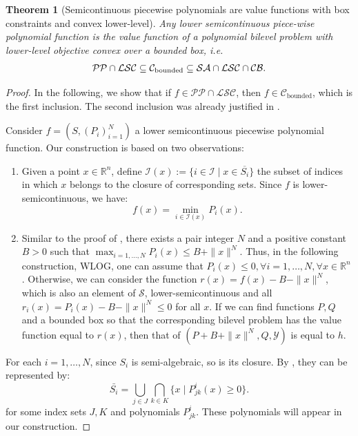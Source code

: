 \documentclass{article}
\newcommand*{\cC}{\mathcal{C}}
\newcommand*{\cI}{\mathcal{I}}
\newcommand*{\cS}{\mathcal{S}}
\newcommand*{\cY}{\mathcal{Y}}
\newcommand*{\RR}{\mathbb{R}}
\newcommand{\tupfuncN}{(P_i)_{i = 1}^N}
\newcommand{\SA}{\mathcal{SA}}
\newcommand{\LSC}{\mathcal{LSC}}
\newcommand{\BC}{\mathcal{CB}}
\newcommand{\PP}{\mathcal{PP}}
\newcommand{\bounded}{\text{bounded}}
\theoremstyle{plain}
\newtheorem{theorem}{Theorem}[section]
\theoremstyle{definition}
\begin{document}
\begin{theorem}[Semicontinuous piecewise polynomials are value functions with box constraints and convex lower-level]
\label{theorem:convex-compact-bilevel-class}
    Any lower semicontinuous piece-wise polynomial function is the value function of a polynomial bilevel problem with lower-level objective convex over a bounded box, i.e.
    \begin{equation*}
        \begin{aligned}
            \PP \cap \LSC \subseteq \cC_{\textup{\bounded}} \subseteq \SA \cap \LSC \cap \BC.
        \end{aligned}
    \end{equation*}
\end{theorem}

\begin{proof}
    In the following, we show that if $f \in \PP \cap \LSC$, then $f \in \cC_{\bounded}$, which is the first inclusion. The second inclusion was already justified in .
    
    Consider $f = (S, \tupfuncN)$ a lower semicontinuous piecewise polynomial function. Our construction is based on two observations:
    \begin{enumerate}
        \item Given a point $x \in \RR^n$, define $\cI(x) := \{i \in \cI \mid x \in \overline{S_i}\}$ the subset of indices in which $x$ belongs to the closure of corresponding sets. Since $f$ is lower-semicontinuous, we have:
        \begin{equation}
            \label{eq:minimum-selection}
            f(x) = \min_{i \in \cI(x)} P_i(x).
        \end{equation}
        \item Similar to the proof of , there exists a pair integer $N$ and a positive constant $B > 0$ such that $\max_{i = 1, \ldots, N} P_i(x) \leq B + \|x\|^N$. Thus, in the following construction, WLOG, one can assume that $P_i(x) \leq 0, \forall i = 1, \ldots, N, \forall x \in \RR^n$. Otherwise, we can consider the function $r(x) = f(x) - B - \|x\|^N$, which is also an element of $\cS$, lower-semicontinuous and all $r_i(x) = P_i(x) - B - \|x\|^N \leq 0$ for all $x$. If we can find functions $P, Q$ and a bounded box so that the corresponding bilevel problem has the value function equal to $r(x)$, then that of $(P + B + \|x\|^N, Q, \cY)$ is equal to $h$. 
    \end{enumerate}
    For each $i=1,\ldots, N$, since $S_i$ is semi-algebraic, so is its closure. By , they can be represented by:
    \begin{equation}
        \label{eq:closure-elementary-set-representation}
        \bar{S_i} = \bigcup_{j \in J}\bigcap_{k \in K} \{x \mid P^i_{jk}(x) \geq 0\}.
    \end{equation}
    for some index sets $J, K$ and polynomials $P^i_{jk}$. These polynomials will appear in our construction. 


\end{proof}
\end{document}
